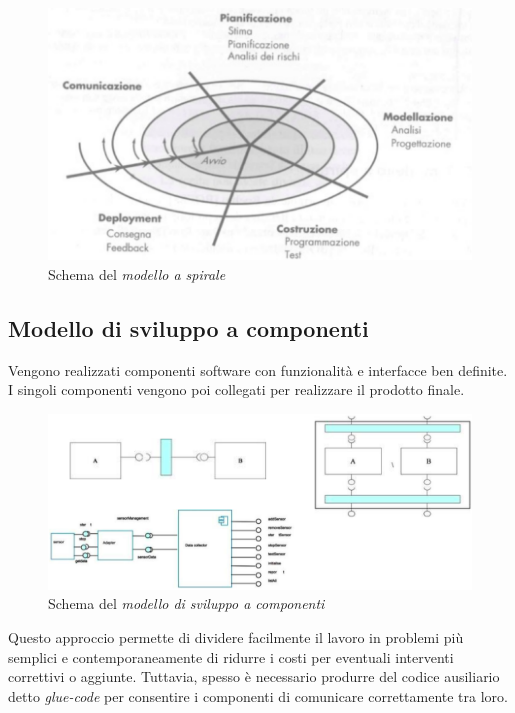 \documentclass[12pt, a4paper]{report}
\theoremstyle{def}
\theoremstyle{definition}
\begin{document}
\begin{figure}[h]
    \centering
    \includegraphics[width=\textwidth]{modello-a-spirale.png}
    \caption{Schema del \emph{modello a spirale}}
\end{figure}

\subsection{Modello di sviluppo a componenti}
Vengono realizzati componenti software con funzionalità e interfacce ben
definite. I singoli componenti vengono poi collegati per realizzare il
prodotto finale.

\begin{figure}[h]
    \centering
    \includegraphics[scale=0.33]{modello-a-componenti.png}
    \caption{Schema del \emph{modello di sviluppo a componenti}}
\end{figure}\noindent
Questo approccio permette di dividere facilmente il lavoro in problemi più
semplici e contemporaneamente di ridurre i costi per eventuali interventi
correttivi o aggiunte. Tuttavia, spesso è necessario produrre del codice
ausiliario detto \emph{glue-code} per consentire i componenti di comunicare
correttamente tra loro.
\end{document}
